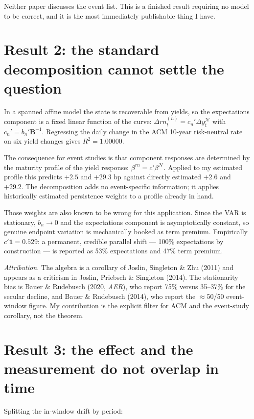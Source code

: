 \documentclass[11pt]{article}
\begin{document}
Neither paper discusses the event list. This is a finished result requiring no model to be correct, and it is the most immediately publishable thing I have.

\section{Result 2: the standard decomposition cannot settle the question}

In a spanned affine model the state is recoverable from yields, so the expectations component is a fixed linear function of the curve: $\Delta rn^{(n)}_t=c_n'\Delta y^{\mathcal N}_t$ with $c_n'=b_n'\mathbf B^{-1}$. Regressing the daily change in the ACM 10-year risk-neutral rate on six yield changes gives $R^2=1.00000$.

The consequence for event studies is that component responses are determined by the maturity profile of the yield response: $\beta^{rn}=c'\beta^{\mathcal N}$. Applied to my estimated profile this predicts $+2.5$ and $+29.3$ bp against directly estimated $+2.6$ and $+29.2$. The decomposition adds no event-specific information; it applies historically estimated persistence weights to a profile already in hand.

Those weights are also known to be wrong for this application. Since the VAR is stationary, $b_n\to0$ and the expectations component is asymptotically constant, so genuine endpoint variation is mechanically booked as term premium. Empirically $c'\boldsymbol 1=0.529$: a permanent, credible parallel shift --- 100\% expectations by construction --- is reported as 53\% expectations and 47\% term premium.

\textit{Attribution.} The algebra is a corollary of Joslin, Singleton \& Zhu (2011) and appears as a criticism in Joslin, Priebsch \& Singleton (2014). The stationarity bias is Bauer \& Rudebusch (2020, \emph{AER}), who report 75\% versus 35--37\% for the secular decline, and Bauer \& Rudebusch (2014), who report the $\approx$50/50 event-window figure. My contribution is the explicit filter for ACM and the event-study corollary, not the theorem.

\section{Result 3: the effect and the measurement do not overlap in time}

Splitting the in-window drift by period:
\end{document}
